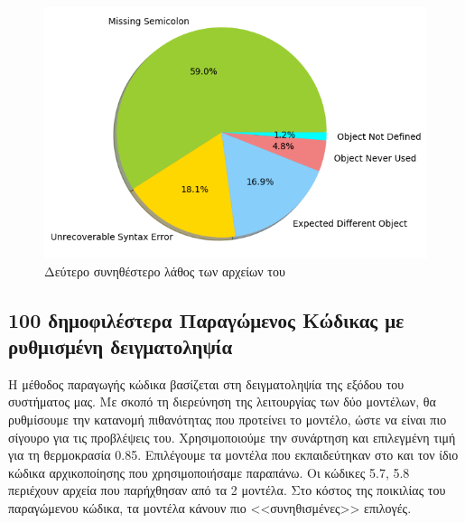 \begin{figure}
	\includegraphics[width=\textwidth, keepaspectratio]{images/MCE2-npmlabeled.png}
	\caption{Δεύτερο συνηθέστερο λάθος των αρχείων του }
	\label{MCE2-npmlabeled}
\end{figure}

\pagebreak 

\subsection{100 δημοφιλέστερα  Παραγώμενος Κώδικας με ρυθμισμένη δειγματοληψία}

Η μέθοδος παραγωγής κώδικα βασίζεται στη δειγματοληψία της εξόδου του συστήματος μας. Με σκοπό τη διερεύνηση της λειτουργίας των δύο μοντέλων, θα ρυθμίσουμε την κατανομή πιθανότητας που προτείνει το μοντέλο, ώστε να είναι πιο σίγουρο για τις προβλέψεις του. Χρησιμοποιούμε την συνάρτηση  και επιλεγμένη τιμή για τη θερμοκρασία  0.85. Επιλέγουμε τα μοντέλα που εκπαιδεύτηκαν στο  και τον ίδιο κώδικα αρχικοποίησης που χρησιμοποιήσαμε παραπάνω. Οι κώδικες 5.7, 5.8 περιέχουν αρχεία που παρήχθησαν από τα 2 μοντέλα. Στο κόστος της ποικιλίας του παραγώμενου κώδικα, τα μοντέλα κάνουν πιο <<συνηθισμένες>> επιλογές.   



\pagebreak



